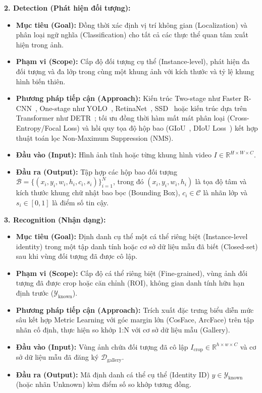 \textbf{2. Detection (Phát hiện đối tượng):}
\begin{itemize}
    \item \textbf{Mục tiêu (Goal):} Đồng thời xác định vị trí không gian (Localization) và phân loại ngữ nghĩa (Classification) cho tất cả các thực thể quan tâm xuất hiện trong ảnh.
    \item \textbf{Phạm vi (Scope):} Cấp độ đối tượng cụ thể (Instance-level), phát hiện đa đối tượng và đa lớp trong cùng một khung ảnh với kích thước và tỷ lệ khung hình biến thiên.
    \item \textbf{Phương pháp tiếp cận (Approach):} Kiến trúc Two-stage như Faster R-CNN~\citep{ren2015faster}, One-stage như YOLO~\citep{redmon2016you}, RetinaNet~\citep{lin2017focal}, SSD~\citep{liu2016ssd} hoặc kiến trúc dựa trên Transformer như DETR~\citep{carion2020end}; tối ưu đồng thời hàm mất mát phân loại (Cross-Entropy/Focal Loss) và hồi quy tọa độ hộp bao (GIoU~\citep{rezatofighi2019generalized}, DIoU Loss~\citep{zheng2020distance}) kết hợp thuật toán lọc Non-Maximum Suppression (NMS).
    \item \textbf{Đầu vào (Input):} Hình ảnh tĩnh hoặc từng khung hình video $I \in \mathbb{R}^{H \times W \times C}$.
    \item \textbf{Đầu ra (Output):} Tập hợp các hộp bao đối tượng $\mathcal{B} = \{(x_i, y_i, w_i, h_i, c_i, s_i)\}_{i=1}^N$, trong đó $(x_i, y_i, w_i, h_i)$ là tọa độ tâm và kích thước khung chữ nhật bao bọc (Bounding Box), $c_i \in \mathcal{C}$ là nhãn lớp và $s_i \in [0, 1]$ là điểm số tin cậy.
\end{itemize}

\textbf{3. Recognition (Nhận dạng):}
\begin{itemize}
    \item \textbf{Mục tiêu (Goal):} Định danh cụ thể một cá thể riêng biệt (Instance-level identity) trong một tập danh tính hoặc cơ sở dữ liệu mẫu đã biết (Closed-set) sau khi vùng đối tượng đã được cô lập.
    \item \textbf{Phạm vi (Scope):} Cấp độ cá thể riêng biệt (Fine-grained), vùng ảnh đối tượng đã được crop hoặc căn chỉnh (ROI), không gian danh tính hữu hạn định trước ($\mathcal{Y}_{\text{known}}$).
    \item \textbf{Phương pháp tiếp cận (Approach):} Trích xuất đặc trưng biểu diễn mức sâu kết hợp Metric Learning với góc margin lớn (CosFace, ArcFace) trên tập nhãn cố định, thực hiện so khớp 1:N với cơ sở dữ liệu mẫu (Gallery).
    \item \textbf{Đầu vào (Input):} Vùng ảnh chứa đối tượng đã cô lập $I_{\text{crop}} \in \mathbb{R}^{h \times w \times C}$ và cơ sở dữ liệu mẫu đã đăng ký $\mathcal{D}_{\text{gallery}}$.
    \item \textbf{Đầu ra (Output):} Mã định danh cá thể cụ thể (Identity ID) $y \in \mathcal{Y}_{\text{known}}$ (hoặc nhãn Unknown) kèm điểm số so khớp tương đồng.
\end{itemize}

